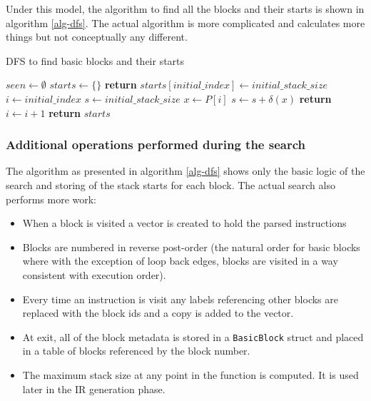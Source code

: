 Under this model, the algorithm to find all the blocks and their starts is shown in algorithm
\ref{alg-dfs}. The actual algorithm is more complicated and calculates more things but not
conceptually any different.

\begin{algorithm}
      \caption{DFS to find basic blocks and their starts}\label{alg-dfs}
      \begin{algorithmic}[1]
            \State $seen \gets \emptyset$
            \State $starts \gets \{\}$
            \State \textbf{return}
            \EndIf
            \State $starts[initial\_index] \gets initial\_stack\_size$
            \State $i \gets initial\_index$
            \State $s \gets initial\_stack\_size$
            \Repeat
            \State $x \gets P[i]$
            \State $s \gets s + \delta(x)$
            \State {}
            \EndFor
            \State {}
            \EndIf
            \State \textbf{return}
            \EndIf
            \State $i \gets i + 1$
            \EndFunction
            \State {}
            \State \textbf{return} $starts$
            \EndFunction
      \end{algorithmic}
\end{algorithm}

\subsubsection{Additional operations performed during the search} \label{addop}

The algorithm as presented in algorithm \ref{alg-dfs} shows only the basic logic of the search and
storing of the stack starts for each block. The actual search also performs more work:

\begin{itemize}
      \item When a block is visited a vector is created to hold the parsed instructions
      \item Blocks are numbered in reverse post-order (the natural order for basic blocks where
            with the exception of loop back edges, blocks are visited in a way consistent with
            execution order).
      \item Every time an instruction is visit any labels referencing other blocks are replaced
            with the block ids and a copy is added to the vector.
      \item At exit, all of the block metadata is stored in a \texttt{BasicBlock} struct and placed
            in a table of blocks referenced by the block number.
      \item The maximum stack size at any point in the function is computed. It is used later in
            the IR generation phase.
\end{itemize}

